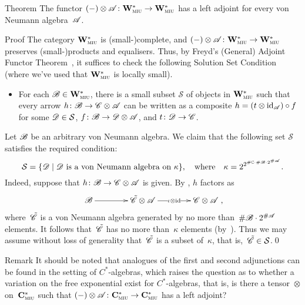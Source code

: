 \documentclass[a]{subfiles}
\begin{document}
\begin{parsec}
\begin{point}{Theorem}%
The functor $(-)\otimes\mathscr{A}\colon\mathbf{W}^*_{\text{\textsc{miu}}}\to\mathbf{W}^*_{\text{\textsc{miu}}}$
has a left adjoint
for every von Neumann algebra~$\mathscr{A}$.
\begin{point}{Proof}%
	The category $\mathbf{W}^*_{\text{\textsc{miu}}}$ is (small-)complete,
and
$(-)\otimes\mathscr{A}\colon\mathbf{W}^*_{\text{\textsc{miu}}}\to\mathbf{W}^*_{\text{\textsc{miu}}}$
preserves (small-)products and equalisers.
Thus,
by Freyd's (General)
Adjoint Functor Theorem~\cite[Thm.~V.6.2]{maclane1978},
it suffices to check the following Solution Set Condition
(where we've used that $\mathbf{W}^*_{\text{\textsc{miu}}}$
is locally small).
\begin{itemize}
\item
	For each $\mathscr{B}\in\mathbf{W}^*_{\text{\textsc{miu}}}$, there is a small subset $\mathcal{S}$ of objects in $\mathbf{W}^*_{\text{\textsc{miu}}}$
such that every arrow $h\colon \mathscr{B}\to\mathscr{C}\otimes\mathscr{A}$
can be written as a composite $h=(t\otimes\operatorname{id}_{\mathscr{A}})\circ f$ for some $\mathscr{D}\in \mathcal{S}$,
$f\colon\mathscr{B}\to\mathscr{D}\otimes \mathscr{A}$, and $t\colon \mathscr{D}\to\mathscr{C}$.
\end{itemize}
Let $\mathscr{B}$ be an arbitrary von Neumann algebra.
We claim that the following set $\mathcal{S}$ satisfies the required condition:
\[
	\mathcal{S}=
\{\mathscr{D}\mid
\text{$\mathscr{D}$ is a von Neumann algebra on~$\kappa$}\},
\quad\text{where}\quad\kappa=2^{2^{\#\mathbb{C}\cdot\#\mathscr{B}\cdot2^{\#\mathscr{A}}}}.
\]
Indeed,
suppose that $h\colon \mathscr{B}\to\mathscr{C}\otimes\mathscr{A}$ is given.
By ,
$h$ factors
as
\begin{equation*}
	\xymatrix@C=4em{\scrB\ar[r] & \tilde\scrC\otimes 
\scrA\ar[r]|-{\iota\otimes \id} & \scrC\otimes\scrA },
\end{equation*}
where~$\tilde{\mathscr{C}}$
is a von Neumann algebra
generated by no more than~$\#\mathscr{B}\cdot2^{\#\mathscr{A}}$
elements.
It follows that~$\tilde{\mathscr{C}}$ has no
more than~$\kappa$ elements (by~).
Thus we may assume without loss of generality
that~$\tilde{\mathscr{C}}$
is a subset of~$\kappa$,
that is,~$\tilde{\mathscr{C}}\in\mathcal{S}$.\qed
\end{point}
\end{point}
\begin{point}{Remark}%
It should be noted that analogues
of the first and second adjunctions
can be found in the setting of $C^*$-algebras,
which raises the question as to whether
a variation on the free exponential exist for $C^*$-algebras,
that is, is there a tensor~$\otimes$ on~$\mathbf{C}^*_{\text{\textsc{miu}}}$
such that $(-)\otimes \mathscr{A}\colon
\mathbf{C}^*_{\text{\textsc{miu}}}\to\mathbf{C}^*_{\text{\textsc{miu}}}$
has a left adjoint?


\end{point}
\end{parsec}
\end{document}
